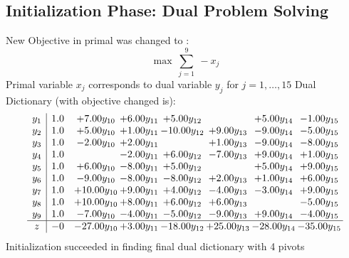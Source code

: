 \documentclass[9pt]{article}
\begin{document}
\subsection{Initialization Phase: Dual Problem Solving}
New Objective in primal was changed to : \[ \max\ \sum_{j=1}^{9}\ - x_j \] 
Primal variable $x_j$ corresponds to dual variable $y_j$ for $j = 1,\ldots,15$
Dual Dictionary (with objective changed is): 
\[\begin{array}{c| c c@{\hskip 2pt} c@{\hskip 2pt} c@{\hskip 2pt} c@{\hskip 2pt} c@{\hskip 2pt} c@{\hskip 2pt} }
 y_{1}   &  1.0 & +  7.00 y_{10} & +  6.00 y_{11} & +  5.00 y_{12} &   & +  5.00 y_{14} & -1.00 y_{15}\\
 y_{2}   &  1.0 & +  5.00 y_{10} & +  1.00 y_{11} & -10.00 y_{12} & +  9.00 y_{13} & -9.00 y_{14} & -5.00 y_{15}\\
 y_{3}   &  1.0 & -2.00 y_{10} & +  2.00 y_{11} &   & +  1.00 y_{13} & -9.00 y_{14} & -8.00 y_{15}\\
 y_{4}   &  1.0  &   & -2.00 y_{11} & +  6.00 y_{12} & -7.00 y_{13} & +  9.00 y_{14} & +  1.00 y_{15}\\
 y_{5}   &  1.0 & +  6.00 y_{10} & -8.00 y_{11} & +  5.00 y_{12} &   & +  5.00 y_{14} & +  9.00 y_{15}\\
 y_{6}   &  1.0 & -9.00 y_{10} & -8.00 y_{11} & -8.00 y_{12} & +  2.00 y_{13} & +  1.00 y_{14} & +  6.00 y_{15}\\
 y_{7}   &  1.0 & + 10.00 y_{10} & +  9.00 y_{11} & +  4.00 y_{12} & -4.00 y_{13} & -3.00 y_{14} & +  9.00 y_{15}\\
 y_{8}   &  1.0 & + 10.00 y_{10} & +  8.00 y_{11} & +  6.00 y_{12} & +  6.00 y_{13} &   & -5.00 y_{15}\\
 y_{9}   &  1.0 & -7.00 y_{10} & -4.00 y_{11} & -5.00 y_{12} & -9.00 y_{13} & +  9.00 y_{14} & -4.00 y_{15}\\
\hline
z    &  -0 & -27.00 y_{10} & +  3.00 y_{11} & -18.00 y_{12} & + 25.00 y_{13} & -28.00 y_{14} & -35.00 y_{15}\\
\end{array}\]
Initialization succeeded in finding final dual dictionary with 4 pivots
\end{document}
